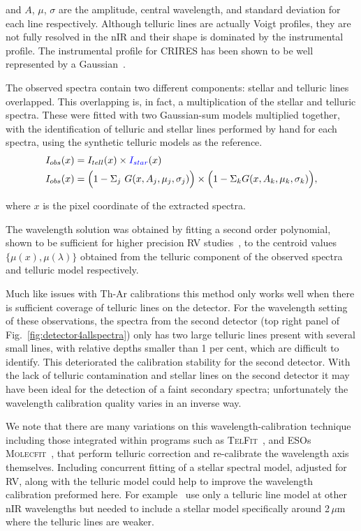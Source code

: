 \documentclass[fleqn,usenatbib]{mnras}
\newcommand*\bl{\color{blue}}
\begin{document}
and \(A\), \(\mu\), \(\sigma\) are the amplitude, central wavelength, and standard deviation for each line respectively. {Although telluric lines are actually Voigt profiles, they are not fully resolved in the nIR and their shape is dominated by the instrumental profile. The instrumental profile for CRIRES has been shown to be well represented by a Gaussian~\citep{seifahrt_synthesising_2010}.}

The observed spectra contain two different components: stellar and telluric lines overlapped. This overlapping is, in fact, a multiplication of the stellar and telluric spectra. These were fitted with two Gaussian-sum models multiplied together, with the identification of telluric and stellar lines performed {by hand} for each spectra, using the synthetic telluric models as the reference.
\begin{align}
I_{obs}(x) &= I_{tell}(x) \times {\bl I_{star}}(x) \nonumber \\
I_{obs}(x) &= \Big(1 - {\Sigma}_{j}\ G(x, A_{j}, {\mu}_{j}, {\sigma}_{j})\Big) \times \Big(1 - {\Sigma}_{k} G(x, A_{k}, {\mu}_{k}, {\sigma}_{k})\Big), \label{eqn:obs}
\end{align}

where \(x\) is the pixel coordinate of the extracted spectra.

The wavelength solution was obtained by fitting a second order polynomial, shown to be sufficient for higher precision RV studies~\citep[e.g.][]{bean_groundbased_2010, figueira_radial_2010, seifahrt_synthesising_2010}, to the centroid values \(\{\mu(x), \mu(\lambda)\}\) obtained from the telluric component of the observed spectra and telluric model respectively.

Much like issues with Th-Ar calibrations this method only works well when there is sufficient coverage of telluric lines on the detector. For the wavelength setting of these observations, the spectra from the second detector (top right panel of Fig.~\ref{fig:detector4allspectra}) only has two large telluric lines present with several small lines, with relative depths smaller than 1 per cent, which are difficult to identify. This deteriorated the calibration stability for the second detector. With the lack of telluric contamination and stellar lines on the second detector it may have been ideal for the detection of a faint secondary spectra; unfortunately the wavelength calibration quality varies in an inverse way.

We note that there are many variations on this wavelength-calibration technique including those integrated within programs such as \textsc{TelFit}~\citet{gullikson_correcting_2014}, and ESOs \textsc{Molecfit}~\citet{smette_molecfit_2015}, that perform telluric correction and re-calibrate the wavelength axis themselves. {Including concurrent fitting of a stellar spectral model, adjusted for RV, along with the telluric model could help to improve the wavelength calibration preformed here. For example~\citet{piskorz_evidence_2016} use only a telluric line model at other nIR wavelengths but needed to include a stellar model specifically around 2\,$\mu$m where the telluric lines are weaker.}
\end{document}
